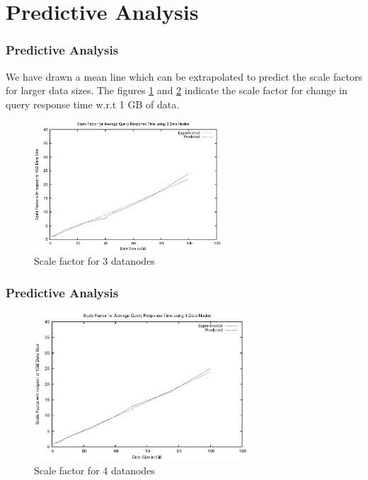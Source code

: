 \documentclass[12pt,xcolor=dvipsnames]{beamer}
\begin{document}
\section{Predictive Analysis}
\begin{frame}[t]
\frametitle{Predictive Analysis}
We have drawn a mean line which can be extrapolated to predict the scale factors for larger data sizes.
The figures \ref{sf3} and \ref{sf4} indicate the scale factor for change in  query response time w.r.t 1 GB of data.
\begin{figure}[h]
 \includegraphics[width=7cm]{sf3.eps}
\caption{Scale factor for 3 datanodes \label{sf3}}
\end{figure}
\end{frame}

\begin{frame}[t]
\frametitle{Predictive Analysis}
\begin{figure}[h]
 \includegraphics[width=8cm]{sf4.eps}
\caption{Scale factor for 4 datanodes \label{sf4}}
\end{figure}
\end{frame}
\end{document}
